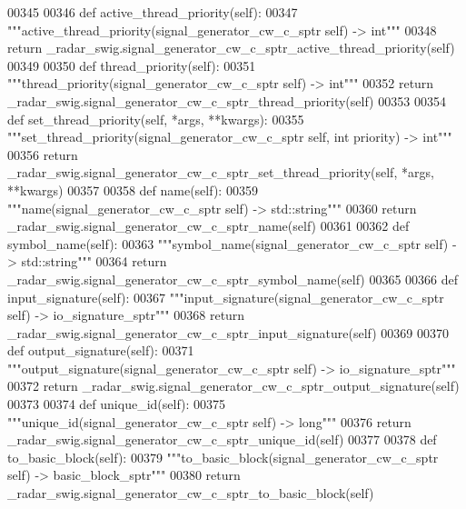\begin{DoxyCode}
{{{00345 
00346     \textcolor{keyword}{def }active_thread_priority(self):
00347         \textcolor{stringliteral}{"""active\_thread\_priority(signal\_generator\_cw\_c\_sptr self) -> int"""}
00348         \textcolor{keywordflow}{return} \_radar\_swig.signal\_generator\_cw\_c\_sptr\_active\_thread\_priority(self)
00349 
00350     \textcolor{keyword}{def }thread_priority(self):
00351         \textcolor{stringliteral}{"""thread\_priority(signal\_generator\_cw\_c\_sptr self) -> int"""}
00352         \textcolor{keywordflow}{return} \_radar\_swig.signal\_generator\_cw\_c\_sptr\_thread\_priority(self)
00353 
00354     \textcolor{keyword}{def }set_thread_priority(self, *args, **kwargs):
00355         \textcolor{stringliteral}{"""set\_thread\_priority(signal\_generator\_cw\_c\_sptr self, int priority) -> int"""}
00356         \textcolor{keywordflow}{return} \_radar\_swig.signal\_generator\_cw\_c\_sptr\_set\_thread\_priority(self, *args, **kwargs)
00357 
00358     \textcolor{keyword}{def }name(self):
00359         \textcolor{stringliteral}{"""name(signal\_generator\_cw\_c\_sptr self) -> std::string"""}
00360         \textcolor{keywordflow}{return} \_radar\_swig.signal\_generator\_cw\_c\_sptr\_name(self)
00361 
00362     \textcolor{keyword}{def }symbol_name(self):
00363         \textcolor{stringliteral}{"""symbol\_name(signal\_generator\_cw\_c\_sptr self) -> std::string"""}
00364         \textcolor{keywordflow}{return} \_radar\_swig.signal\_generator\_cw\_c\_sptr\_symbol\_name(self)
00365 
00366     \textcolor{keyword}{def }input_signature(self):
00367         \textcolor{stringliteral}{"""input\_signature(signal\_generator\_cw\_c\_sptr self) -> io\_signature\_sptr"""}
00368         \textcolor{keywordflow}{return} \_radar\_swig.signal\_generator\_cw\_c\_sptr\_input\_signature(self)
00369 
00370     \textcolor{keyword}{def }output_signature(self):
00371         \textcolor{stringliteral}{"""output\_signature(signal\_generator\_cw\_c\_sptr self) -> io\_signature\_sptr"""}
00372         \textcolor{keywordflow}{return} \_radar\_swig.signal\_generator\_cw\_c\_sptr\_output\_signature(self)
00373 
00374     \textcolor{keyword}{def }unique_id(self):
00375         \textcolor{stringliteral}{"""unique\_id(signal\_generator\_cw\_c\_sptr self) -> long"""}
00376         \textcolor{keywordflow}{return} \_radar\_swig.signal\_generator\_cw\_c\_sptr\_unique\_id(self)
00377 
00378     \textcolor{keyword}{def }to_basic_block(self):
00379         \textcolor{stringliteral}{"""to\_basic\_block(signal\_generator\_cw\_c\_sptr self) -> basic\_block\_sptr"""}
00380         \textcolor{keywordflow}{return} \_radar\_swig.signal\_generator\_cw\_c\_sptr\_to\_basic\_block(self)
}}}
\end{DoxyCode}
